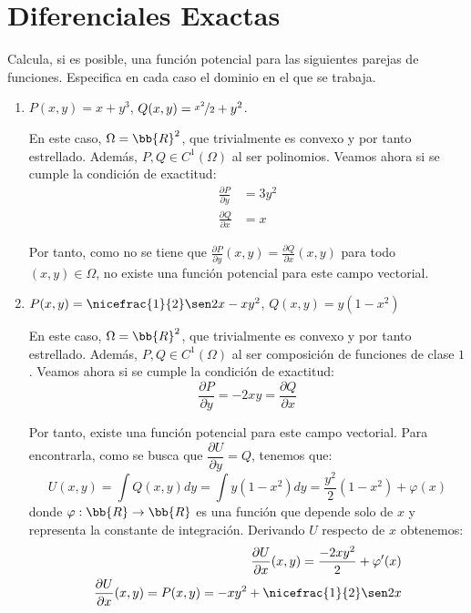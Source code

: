 \section{Diferenciales Exactas}

\begin{ejercicio} \label{ej:3.1}
    Calcula, si es posible, una función potencial para las siguientes parejas de funciones. Especifica en cada caso el
    dominio en el que se trabaja.
    \begin{enumerate}
        \item $P(x, y) = x + y^3$, $Q(x, y) = \nicefrac{x^2}{2} + y^2$.
        
        En este caso, $\Omega=\bb{R}^2$, que trivialmente es convexo y por tanto estrellado. Además, $P,Q\in C^1(\Omega)$ al ser polinomios. Veamos ahora si se cumple la condición de exactitud:
        \begin{align*}
            \frac{\partial P}{\partial y} &= 3y^2 \\
            \frac{\partial Q}{\partial x}&= x
        \end{align*}

        Por tanto, como no se tiene que $\frac{\partial P}{\partial y}(x,y)=\frac{\partial Q}{\partial x}(x,y)$ para todo $(x,y)\in\Omega$, no existe una función potencial para este campo vectorial.
        \item $P(x, y) = \nicefrac{1}{2} \sen 2x - xy^2$, $Q(x, y) = y(1 - x^2)$
        
        En este caso, $\Omega=\bb{R}^2$, que trivialmente es convexo y por tanto estrellado. Además, $P,Q\in C^1(\Omega)$ al ser composición de funciones de clase $1$. Veamos ahora si se cumple la condición de exactitud:
        \begin{equation*}
            \frac{\partial P}{\partial y} = -2xy = \frac{\partial Q}{\partial x}
        \end{equation*}

        Por tanto, existe una función potencial para este campo vectorial. Para encontrarla, como se busca que $\dfrac{\partial U}{\partial y}=Q$, tenemos que:
        \begin{equation*}
            U(x,y)=\int Q(x,y)dy =
            \int y(1-x^2)dy = \frac{y^2}{2}(1-x^2)+\varphi(x)
        \end{equation*}
        donde $\varphi:\bb{R}\to\bb{R}$ es una función que depende solo de $x$ y representa la constante de integración. Derivando $U$ respecto de $x$ obtenemos:
        \begin{align*}
            \frac{\partial U}{\partial x}(x,y)=\frac{-2xy^2}{2}+\varphi'(x)\\
            \frac{\partial U}{\partial x}(x,y)=P(x,y)=-xy^2+\nicefrac{1}{2}\sen 2x
        \end{align*}


\end{enumerate}
\end{ejercicio}
